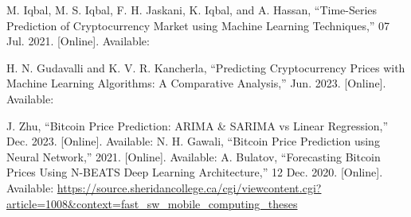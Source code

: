 \documentclass{ieeeojies}
\begin{document}
\begin{thebibliography}{00}
	M. Iqbal, M. S. Iqbal, F. H. Jaskani, K. Iqbal, and A. Hassan, ``Time-Series Prediction of Cryptocurrency Market using Machine Learning Techniques,'' 07 Jul. 2021. [Online]. Available: 
	
	H. N. Gudavalli and K. V. R. Kancherla, ``Predicting Cryptocurrency Prices with Machine Learning Algorithms: A Comparative Analysis,'' Jun. 2023. [Online]. Available: 
	
	J. Zhu, ``Bitcoin Price Prediction: ARIMA \& SARIMA vs Linear Regression,'' Dec. 2023. [Online]. Available: 
	N. H. Gawali, ``Bitcoin Price Prediction using Neural Network,'' 2021. [Online]. Available: 
	A. Bulatov, ``Forecasting Bitcoin Prices Using N-BEATS Deep Learning Architecture,'' 12 Dec. 2020. [Online]. Available: \url{https://source.sheridancollege.ca/cgi/viewcontent.cgi?article=1008&context=fast_sw_mobile_computing_theses}
	
\end{thebibliography}
\EOD
\end{document}
